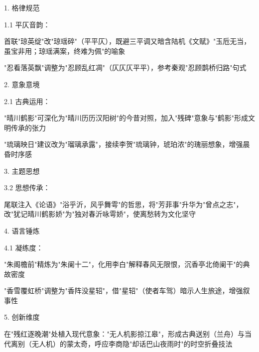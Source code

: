 \begin{tcolorbox}[
  colback=white, %
  colframe=black, 
  boxrule=1pt,        %
  arc=0mm             %
  ]
  \kaishu 
  [改进建议]\par
  1. 格律规范\par
  \hspace{2em}1.1 平仄音韵：\par
  \hspace{2em}首联"琼英绽"改"琼瑶碎"（平平仄），既避三平调又暗含陆机《文赋》"玉卮无当，虽宝非用；琼瑶满案，终难为佩"的喻象\par
  \hspace{2em}"忍看落英飘"调整为"忍顾乱红凋"（仄仄仄平平），参考秦观"忍顾鹊桥归路"句式\par
  2. 意象意境\par
  \hspace{2em}2.1 古典运用：\par
  \hspace{2em}"晴川鹤影"可深化为"晴川历历汉阳树"的今昔对照，加入"残碑"意象与"鹤影"形成文明传承的张力\par
  \hspace{2em}"琉璃映日"建议改为"瑠璃承露"，接续李贺"琉璃钟，琥珀浓"的瑰丽想象，增强晨昏时序感\par
  3. 主题思想\par
  \hspace{2em}3.2 思想传承：\par
  \hspace{2em}尾联注入《论语》"浴乎沂，风乎舞雩"的哲思，将"芳菲事"升华为"曾点之志"，改"犹记晴川鹤影娇"为"独对春沂咏雩娇"，使离愁转为文化坚守\par
  4. 语言锤炼\par
  \hspace{2em}4.1 凝练度：\par
  \hspace{2em}"朱阁檐前"精炼为"朱阑十二"，化用李白"解释春风无限恨，沉香亭北倚阑干"的典故密度\par
  \hspace{2em}"香雪覆虹桥"调整为"香阵没星轺"，借"星轺"（使者车驾）暗示人生旅途，增强叙事性\par
  5. 创新维度\par
  \hspace{2em}在"残红逐晚潮"处植入现代意象："无人机影掠江皋"，形成古典送别（兰舟）与当代离别（无人机）的蒙太奇，呼应李商隐"却话巴山夜雨时"的时空折叠技法\par

\end{tcolorbox}

